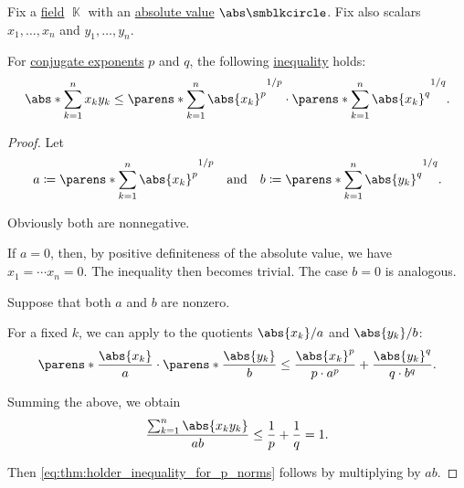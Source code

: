 \begin{theorem}\label{thm:holder_inequality_for_p_norms}
  Fix a \hyperref[def:field]{field} \( \BbbK \) with an \hyperref[def:absolute_value]{absolute value} \( \abs\anon \). Fix also scalars \( x_1, \ldots, x_n \) and \( y_1, \ldots, y_n \).

  For \hyperref[def:conjugate_exponent]{conjugate exponents} \( p \) and \( q \), the following \hyperref[def:inequality]{inequality} holds:
  \begin{equation}\label{eq:thm:holder_inequality_for_p_norms}
    \abs*{ \sum_{k=1}^n x_k y_k } \leq \parens*{ \sum_{k=1}^n \abs{x_k}^p }^{1 / p} \cdot \parens*{ \sum_{k=1}^n \abs{x_k}^q }^{1 / q}.
  \end{equation}
\end{theorem}
\begin{proof}
  Let
  \begin{align*}
    a \coloneqq \parens*{ \sum_{k=1}^n \abs{x_k}^p }^{1 / p}
    &&\T{and}&&
    b \coloneqq \parens*{ \sum_{k=1}^n \abs{y_k}^q }^{1 / q}.
  \end{align*}

  Obviously both are nonnegative.

  If \( a = 0 \), then, by positive definiteness of the absolute value, we have \( x_1 = \cdots x_n = 0 \). The inequality then becomes trivial. The case \( b = 0 \) is analogous.

  Suppose that both \( a \) and \( b \) are nonzero.

  For a fixed \( k \), we can apply  to the quotients \( \abs{ x_k } / a \) and \( \abs{ y_k } / b \):
  \begin{equation*}
    \parens*{ \frac {\abs{ x_k }} a } \cdot \parens*{ \frac {\abs{ y_k }} b }
    \leq
    \frac {\abs{ x_k }^p} {p \cdot a^p} + \frac {\abs{ y_k }^q} {q \cdot b^q}.
  \end{equation*}

  Summing the above, we obtain
  \begin{equation*}
    \frac {\sum_{k=1}^n \abs{ x_k y_k }} {ab}
    \leq
    \frac 1 p + \frac 1 q = 1.
  \end{equation*}

  Then \eqref{eq:thm:holder_inequality_for_p_norms} follows by multiplying by \( ab \).
\end{proof}

